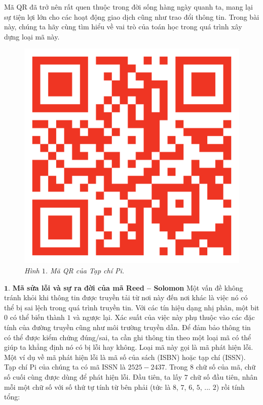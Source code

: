 \begin{multicols}{2}
	Mã QR đã trở nên rất quen thuộc trong đời sống hàng ngày quanh ta, mang lại sự tiện lợi lớn cho các hoạt động giao dịch cũng như trao đổi thông tin. Trong bài này, chúng ta hãy cùng tìm hiểu về vai trò của toán học trong quá trình xây dựng loại mã này.
	\begin{figure}[H]
		\vspace*{-5pt}
		\centering
		\captionsetup{labelformat= empty, justification=centering}
		\includegraphics[width= 1\linewidth]{QR}
		\caption{\small\textit{\color{toanhocdoisong}Hình $1$. Mã QR của Tạp chí Pi.}}
		\vspace*{-10pt}
	\end{figure}
	$\pmb{1.}$ \textbf{\color{toanhocdoisong}Mã sửa lỗi và sự ra đời của mã Reed -- Solomon}
	\vskip 0.05cm
	Một vấn đề không tránh khỏi khi thông tin được truyền tải từ nơi này đến nơi khác là việc nó có thể bị sai lệch trong quá trình truyền tin. Với các tín hiệu dạng nhị phân, một bit $0$ có thể biến thành $1$ và ngược lại. Xác suất của việc này phụ thuộc vào các đặc tính của đường truyền cũng như môi trường truyền dẫn.
	\vskip 0.1cm
	Để đảm bảo thông tin có thể được kiểm chứng đúng/sai, ta cần ghi thông tin theo một loại mã có thể giúp ta khẳng định nó có bị lỗi hay không. Loại mã này gọi là mã phát hiện lỗi.
	\vskip 0.05cm
	Một ví dụ về mã phát hiện lỗi là mã số của sách (ISBN) hoặc tạp chí (ISSN). Tạp chí Pi của chúng ta có mã ISSN là $2525-2437$. Trong $8$ chữ số của mã, chữ số cuối cùng được dùng để phát hiện lỗi. Đầu tiên, ta lấy $7$ chữ số đầu tiên, nhân mỗi một chữ số với số thứ tự tính từ bên phải (tức là $8$, $7$, $6$, $5$, ... $2$) rồi tính tổng:

\end{multicols}
